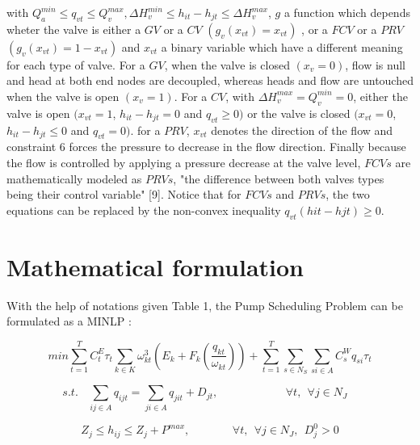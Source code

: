 \documentclass{article}
\begin{document}
with $Q_a^{min} \leq q_{vt} \leq Q_v^{max} , \Delta H_v^{min} \leq  h_{it}-h_{jt} \leq \Delta H_v^{max}$, $g$ a function which depends wheter the valve is either a $GV$ or a $CV$ $(g_v(x_{vt})=x_{vt})$ , or a $FCV$ or a $PRV$ $(g_v(x_{vt})=1-x_{vt})$ and $x_{vt}$ a binary variable which have a different meaning for each type of valve. For a $GV$, when the valve is closed $(x_v=0)$, flow is null and head at both end nodes are decoupled, whereas heads and flow are untouched when the valve is open $(x_v=1)$.
For a $CV$, with $\Delta H_v^{max} = Q_v^{min}=0$, either the valve is open $(x_{vt}=1$, $ h_{it}-h_{jt}=0 $ and $ q_{vt} \geq 0 )$ or the valve is closed $(x_{vt}=0$, $ h_{it}-h_{jt} \leq 0 $ and $ q_{vt} = 0 )$.
for a $PRV$, $x_{vt}$ denotes the direction of the flow and constraint 6 forces the pressure to decrease in the flow direction. Finally because the flow is controlled by applying a pressure decrease at the valve level, $FCVs$ are mathematically modeled as $PRVs$, "the difference between both valves types being their control variable" [9]. Notice that for $FCVs$ and $PRVs$, the two equations can be replaced by the non-convex inequality $q_{vt}(hit-hjt) \geq 0$.




\section{Mathematical formulation}
With the help of notations given Table 1, the Pump Scheduling Problem can be formulated as a MINLP :

\newpage



\begin{equation}
min \sum_{t=1}^{T} C_t^{E} \tau_t\sum_{k \in K} \omega_{kt}^3\left(E_k+F_k\left(\frac {q_{kt}}{\omega_{kt}}\right)    \right) + \sum_{t=1}^{T} \sum_{s \in N_S} \sum_{si \in A} C_s^W q_{si} \tau_t
\end{equation}

\begin{equation}
s.t.~~~~\sum_{ij \in A} q_{ijt} = \sum_{ji \in A} q_{jit} + D_{jt}, ~~~~~~~~~~~~~~~~~~~~~~~~~~~ \forall t,~~\forall j \in N_J~~~~
\end{equation}



\begin{equation}
Z_j \leq h_{ij} \leq Z_j + P^{max}, ~~~~~~~~~~~~~~~~~ \forall t,~~\forall j \in N_J, ~~D_j^0 > 0
\end{equation}
\end{document}
